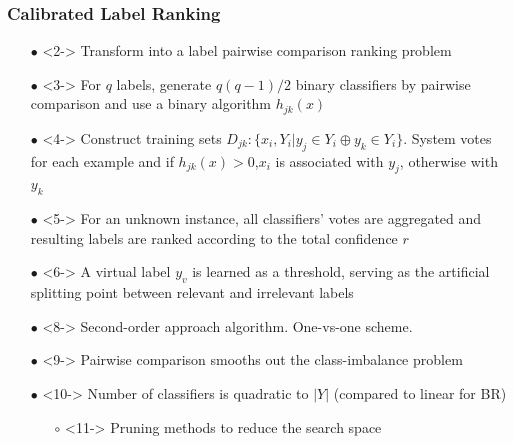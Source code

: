 \documentclass{beamer}
\begin{document}
\begin{frame}
\frametitle{Calibrated Label Ranking}
\begin{itemize}
\item[$\bullet$] <2-> Transform into a label pairwise comparison ranking problem
\item[$\bullet$] <3-> For $q$ labels, generate $q(q-1)/2$ binary classifiers by pairwise comparison and use a binary algorithm $h_{jk}(x)$
\item[$\bullet$] <4-> Construct training sets $D_{jk} : \{x_i, Y_i | y_j \in Y_i \oplus y_k \in Y_i\}$. System votes for each example and if $h_{jk}(x) >0$,$x_i$ is associated with $y_j$, otherwise with $y_k$
\item[$\bullet$] <5-> For an unknown instance, all classifiers' votes are aggregated
  and resulting labels are ranked according to the total confidence $r$
\item[$\bullet$] <6-> A virtual label $y_v$ is learned as a threshold, serving as the artificial splitting point between relevant and irrelevant labels
\end{itemize}
\begin{itemize}
\item[$\bullet$] <8-> Second-order approach algorithm. One-vs-one scheme.
\item[$\bullet$] <9-> Pairwise comparison smooths out the class-imbalance problem
\item[$\bullet$] <10-> Number of classifiers is quadratic to $|Y|$ (compared to linear for BR)
\begin{itemize}
\item[$\circ$] <11-> Pruning methods to reduce the search space
\end{itemize}
\end{itemize}
\end{frame}
\end{document}
